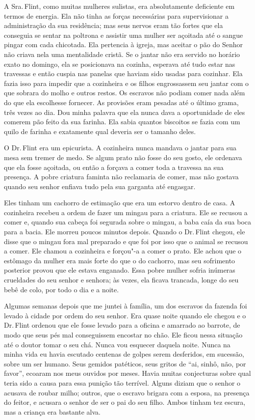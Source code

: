 A Sra.\,Flint, como muitas mulheres
sulistas, era absolutamente deficiente em termos de energia. Ela não
tinha as forças necessárias para supervisionar a administração da sua
residência; mas seus nervos eram tão fortes que ela conseguia se sentar
na poltrona e assistir uma mulher ser açoitada até o sangue pingar com
cada chicotada. Ela pertencia à igreja, mas aceitar o pão do Senhor não
criava nela uma mentalidade cristã. Se o jantar não era servido no
horário exato no domingo, ela se posicionava na cozinha, esperava até
tudo estar nas travessas e então cuspia nas panelas que haviam sido
usadas para cozinhar. Ela fazia isso para impedir que a cozinheira e os
filhos engrossassem seu jantar com o que sobrara do molho e outros
restos. Os escravos não podiam comer nada além do que ela escolhesse
fornecer. As provisões eram pesadas até o último grama, três vezes ao
dia. Dou minha palavra que ela nunca dava a oportunidade de eles comerem
pão feito da sua farinha. Ela sabia quantos biscoitos se fazia com um
quilo de farinha e exatamente qual deveria ser o tamanho deles.

O Dr.\,Flint era um epicurista. A
cozinheira nunca mandava o jantar para sua mesa sem tremer de medo. Se
algum prato não fosse do seu gosto, ele ordenava que ela fosse açoitada,
ou então a forçava a comer toda a travessa na sua presença. A pobre
criatura faminta não reclamaria de comer, mas não gostava quando seu
senhor enfiava tudo pela sua garganta até engasgar.

Eles tinham um cachorro de estimação
que era um estorvo dentro de casa. A cozinheira recebeu a ordem de fazer
um mingau para a criatura. Ele se recusou a comer e, quando sua cabeça
foi segurada sobre o mingau, a baba caía da sua boca para a bacia. Ele
morreu poucos minutos depois. Quando o Dr.\,Flint chegou, ele disse que o
mingau fora mal preparado e que foi por isso que o animal se recusou a
comer. Ele chamou a cozinheira e forçou"-a a comer o prato. Ele achou que
o estômago da mulher era mais forte do que o do cachorro, mas seu
sofrimento posterior provou que ele estava enganado. Essa pobre mulher
sofria inúmeras crueldades do seu senhor e senhora; às vezes, ela ficava
trancada, longe do seu bebê de colo, por todo o dia e a noite.

Algumas semanas depois que me juntei à
família, um dos escravos da fazenda foi levado à cidade por ordem do seu
senhor. Era quase noite quando ele chegou e o Dr.\,Flint
ordenou que ele fosse levado para
a oficina e amarrado ao barrote, de modo que seus pés mal conseguissem
encostar no chão. Ele ficou nessa situação até o doutor tomar o seu chá.
Nunca vou esquecer daquela noite. Nunca na minha vida eu havia escutado
centenas de golpes serem desferidos, em sucessão, sobre um ser humano.
Seus gemidos patéticos, seus gritos de ``ai, sinhô, não, por favor'',
ecoaram nos meus ouvidos por meses. Havia muitas conjecturas sobre qual
teria sido a causa para essa punição tão terrível. Alguns diziam que o
senhor o acusava de roubar milho; outros, que o escravo brigara com a
esposa, na presença do feitor, e acusara o senhor de ser o pai do seu
filho. Ambos tinham tez escura, mas a criança era bastante alva.

